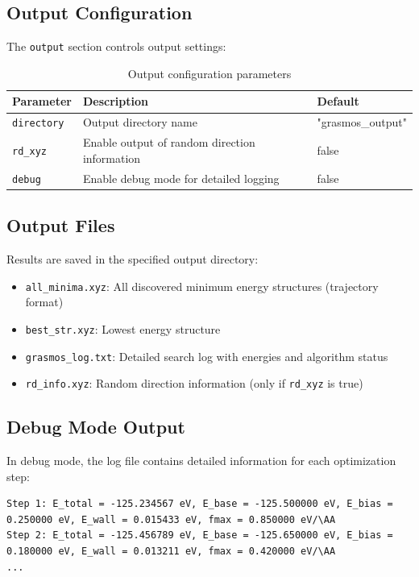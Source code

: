\documentclass[11pt,a4paper]{article}
\begin{document}
\subsection{Output Configuration}

The \texttt{output} section controls output settings:

\begin{table}[h]
\centering
\begin{tabular}{lll}
\toprule
\textbf{Parameter} & \textbf{Description} & \textbf{Default} \\
\midrule
\texttt{directory} & Output directory name & "grasmos\_output" \\
\texttt{rd\_xyz} & Enable output of random direction information & false \\
\texttt{debug} & Enable debug mode for detailed logging & false \\
\bottomrule
\end{tabular}
\caption{Output configuration parameters}
\end{table}

\subsection{Output Files}
Results are saved in the specified output directory:

\begin{itemize}
    \item \texttt{all\_minima.xyz}: All discovered minimum energy structures (trajectory format)
    \item \texttt{best\_str.xyz}: Lowest energy structure
    \item \texttt{grasmos\_log.txt}: Detailed search log with energies and algorithm status
    \item \texttt{rd\_info.xyz}: Random direction information (only if \texttt{rd\_xyz} is true)
\end{itemize}

\subsection{Debug Mode Output}

In debug mode, the log file contains detailed information for each optimization step:

\begin{lstlisting}
Step 1: E_total = -125.234567 eV, E_base = -125.500000 eV, E_bias = 0.250000 eV, E_wall = 0.015433 eV, fmax = 0.850000 eV/\AA
Step 2: E_total = -125.456789 eV, E_base = -125.650000 eV, E_bias = 0.180000 eV, E_wall = 0.013211 eV, fmax = 0.420000 eV/\AA
...
\end{lstlisting}
\end{document}
